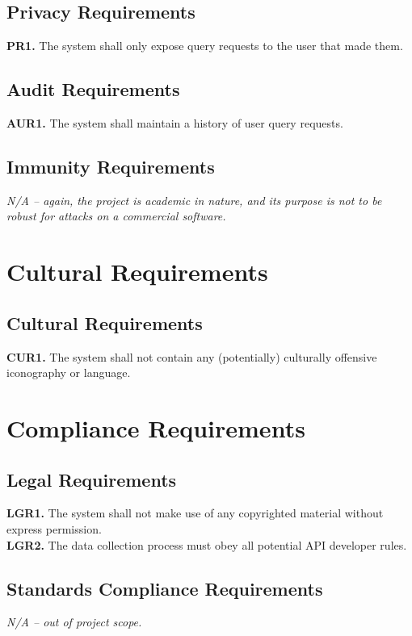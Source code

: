 \documentclass[12pt]{article}
\begin{document}
\subsection{Privacy Requirements}
\textbf{PR1.} The system shall only expose query requests to the user that made them.
\subsection{Audit Requirements}
\textbf{AUR1.} The system shall maintain a history of user query requests.
\subsection{Immunity Requirements}
\emph{N/A -- again, the project is academic in nature, and its purpose is not to be robust for attacks on a commercial software.}
\section{Cultural Requirements}
\subsection{Cultural Requirements}
\textbf{CUR1.} The system shall not contain any (potentially) culturally offensive iconography or language.
\section{Compliance Requirements}
\subsection{Legal Requirements}
\textbf{LGR1.} The system shall not make use of any copyrighted material without express permission. \\
\textbf{LGR2.} The data collection process must obey all potential API developer rules.
\subsection{Standards Compliance Requirements}
\emph{N/A -- out of project scope.}
\end{document}
